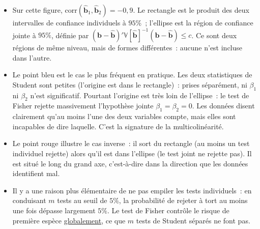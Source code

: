 \documentclass[10pt]{beamer}
\begin{document}
\begin{notes}

  \begin{itemize}

  \item Sur cette figure, $\mathrm{corr}(\hat{\mathbf b}_1, \hat{\mathbf b}_2)=-0{,}9$.
    Le rectangle est le produit des deux intervalles de confiance individuels à $95\%$~;
    l'ellipse est la région de confiance jointe à $95\%$, définie par
    $\left(\mathbf b - \hat{\mathbf b}\right)' \mathbb V[\hat{\mathbf b}]^{-1}
    \left(\mathbf b - \hat{\mathbf b}\right) \leq c$. Ce sont deux régions de même
    niveau, mais de formes différentes~: aucune n'est incluse dans l'autre.\newline

  \item Le point bleu est le cas le plus fréquent en pratique. Les deux statistiques
    de Student sont petites (l'origine est dans le rectangle)~: prises séparément, ni
    $\beta_1$ ni $\beta_2$ n'est significatif. Pourtant l'origine est très loin de
    l'ellipse~: le test de Fisher rejette massivement l'hypothèse jointe
    $\beta_1=\beta_2=0$. Les données disent clairement qu'au moins l'une des deux
    variables compte, mais elles sont incapables de dire laquelle. C'est la signature
    de la multicolinéarité.\newline

  \item Le point rouge illustre le cas inverse~: il sort du rectangle (au moins un test
    individuel rejette) alors qu'il est dans l'ellipse (le test joint ne rejette pas).
    Il est situé le long du grand axe, c'est-à-dire dans la direction que les données
    identifient mal.\newline

  \item Il y a une raison plus élémentaire de ne pas empiler les tests individuels~: en
    conduisant $m$ tests au seuil de $5\%$, la probabilité de rejeter à tort au moins
    une fois dépasse largement $5\%$. Le test de Fisher contrôle le risque de première
    espèce \underline{globalement}, ce que $m$ tests de Student séparés ne font pas.

  \end{itemize}

\end{notes}
\end{document}
